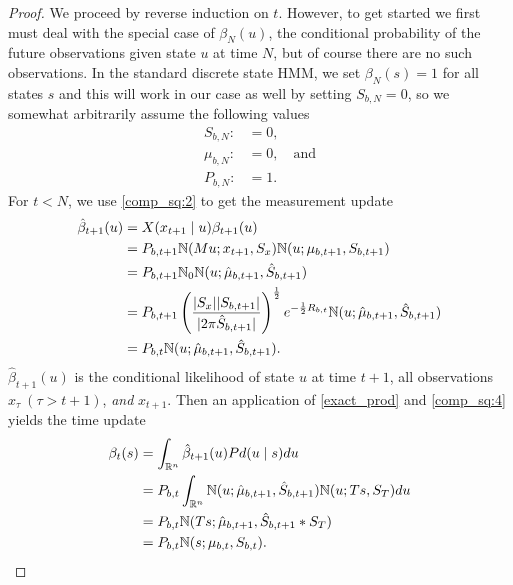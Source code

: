 \documentclass[12pt,leqno]{article}
\begin{document}
\begin{proof}
We proceed by reverse induction on $t$. However, to get started we first must  deal with
the special case of $\beta_{N}(u)$, the conditional probability of the future observations given
state $u$ at time $N$, but of course there are no such observations.  In the standard discrete
state HMM, we set $\beta_N(s) = 1$ for all states $s$ and this will work in our case as well by
setting $S_{b,N} = 0$, so we somewhat arbitrarily assume the following values
\begin{align*}
  S_{b,N} :&= 0,\\
  \mu_{b,N} :&= 0,\quad\text{and}\\
  P_{b,N} :&= 1.
\end{align*}
  For $t <  N$, we use \eqref{comp_sq:2} to get the measurement update 
  \begin{align*}
    \hat{\beta}_{t+1}(u) &= X(x_{t+1}\mid u)\beta_{t+1}(u)\\
    &= P_{b,t+1}{\mathbb N}(Mu;x_{t+1},S_x){\mathbb N}(u;\mu_{b,t+1},S_{b,t+1})\\
    &= P_{b,t+1}{\mathbb N}_0{\mathbb N}(u;\hat{\mu}_{b,t+1},\hat{S}_{b,t+1})\\
  &= P_{b,t+1}\left(\frac{|S_x||S_{b,t+1}|}{|2\pi \hat{S}_{b,t+1}|}\right)^{\frac{1}{2}}e^{-\frac{1}{2}R_{b,t}}
  {\mathbb N}(u;\hat{\mu}_{b,t+1},\hat{S}_{b,t+1})\\
    &= P_{b,t}{\mathbb N}(u;\hat{\mu}_{b,t+1},\hat{S}_{b,t+1}).
  \end{align*}
  $\hat{\beta}_{t+1}(u)$ is the conditional likelihood of state $u$ at time $t+1$, all observations $x_\tau~(\tau > t+1)$,
      {\em and} $x_{t+1}$. Then an application of \eqref{exact_prod} and \eqref{comp_sq:4} yields the time update
  \begin{align*}
    \beta_t(s) &= \int_{{\mathbb R}^n}\hat{\beta}_{t+1}(u)Pd(u\mid s)du \\
    &= P_{b,t}\int_{{\mathbb R}^n}{\mathbb N}(u;\hat{\mu}_{b,t+1},\hat{S}_{b,t+1}){\mathbb N}(u;Ts,S_T)du\\
    &=P_{b,t}{\mathbb N}(Ts;\hat{\mu}_{b,t+1},\hat{S}_{b,t+1}*S_T)\\
    &=P_{b,t}{\mathbb N}(s;\mu_{b,t},S_{b,t}).
  \end{align*}
\end{proof}
\newpage
\end{document}
